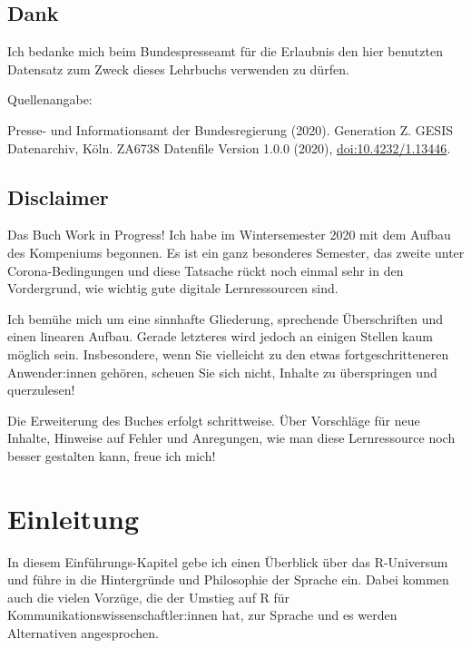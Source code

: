 \documentclass[
]{book}
\begin{document}
\hypertarget{dank}{%
\section*{Dank}\label{dank}}

Ich bedanke mich beim Bundespresseamt für die Erlaubnis den hier benutzten Datensatz zum Zweck dieses Lehrbuchs verwenden zu dürfen.

Quellenangabe:

Presse- und Informationsamt der Bundesregierung (2020). Generation Z. GESIS Datenarchiv, Köln. ZA6738 Datenfile Version 1.0.0 (2020), \href{https://dbk.gesis.org/dbksearch/sdesc2.asp?no=6738\&db=e\&doi=10.4232/1.13446}{doi:10.4232/1.13446}.

\hypertarget{disclaimer}{%
\section*{Disclaimer}\label{disclaimer}}

Das Buch Work in Progress! Ich habe im Wintersemester 2020 mit dem Aufbau des Kompeniums begonnen. Es ist ein ganz besonderes Semester, das zweite unter Corona-Bedingungen und diese Tatsache rückt noch einmal sehr in den Vordergrund, wie wichtig gute digitale Lernressourcen sind.

Ich bemühe mich um eine sinnhafte Gliederung, sprechende Überschriften und einen linearen Aufbau. Gerade letzteres wird jedoch an einigen Stellen kaum möglich sein. Insbesondere, wenn Sie vielleicht zu den etwas fortgeschritteneren Anwender:innen gehören, scheuen Sie sich nicht, Inhalte zu überspringen und querzulesen!

Die Erweiterung des Buches erfolgt schrittweise. Über Vorschläge für neue Inhalte, Hinweise auf Fehler und Anregungen, wie man diese Lernressource noch besser gestalten kann, freue ich mich!

\hypertarget{intro}{%
\chapter{Einleitung}\label{intro}}

In diesem Einführungs-Kapitel gebe ich einen Überblick über das R-Universum und führe in die Hintergründe und Philosophie der Sprache ein. Dabei kommen auch die vielen Vorzüge, die der Umstieg auf R für Kommunikationswissenschaftler:innen hat, zur Sprache und es werden Alternativen angesprochen.
\end{document}

